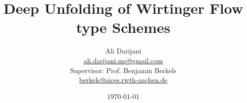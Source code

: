 \title[Deep Unfolding of Wirtinger Flow type Schemes]{Deep Unfolding of Wirtinger Flow type Schemes}
\author[]{Ali Darijani\\ \href{mailto:ali.darijani.me@gmail.com}{ali.darijani.me@gmail.com}\newline
\\ Supervisor: Prof. Benjamin Berkels\\ \href{mailto:berkels@aices.rwth-aachen.de}{berkels@aices.rwth-aachen.de}
}

\date{\today}

\begin{frame}
\titlepage
\end{frame}